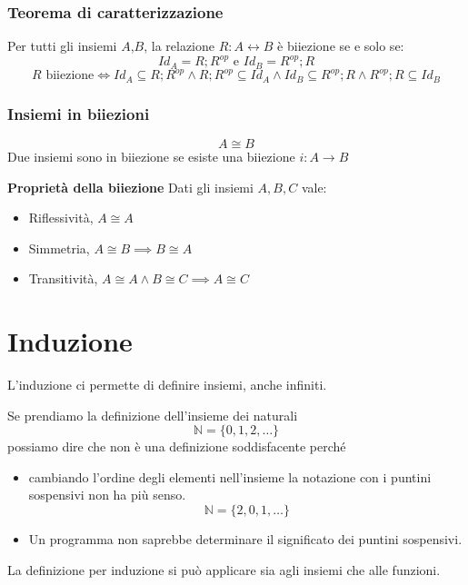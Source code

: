 \documentclass{article}
\begin{document}
\subsubsection{Teorema di caratterizzazione}
Per tutti gli insiemi \(A\),\(B\), la relazione \(R: A \leftrightarrow B\) è biiezione se e solo se:
\[Id_A = R;R^{op} \text{ e } Id_B = R^{op};R\]
\[R \text{ biiezione} \iff Id_A \subseteq R;R^{op} \land R;R^{op} \subseteq Id_A \land Id_B \subseteq R^{op};R \land R^{op};R \subseteq Id_B \]

\subsubsection{Insiemi in biiezioni}
\[A \cong B\]
Due insiemi sono in biiezione se esiste una biiezione \(i: A \rightarrow B\)

\noindent\textbf{Proprietà della biiezione}
Dati gli insiemi \(A,B,C\) vale:
\begin{itemize}
    \item Riflessività, \(A \cong A\)
    \item Simmetria, \(A \cong B \implies B \cong A\)
    \item Transitività, \(A \cong A \land B \cong C \implies A \cong C\)
\end{itemize}

\pagebreak

\section{Induzione}
L'induzione ci permette di definire insiemi, anche infiniti.

\begin{eg}
    Se prendiamo la definizione dell'insieme dei naturali
    \[\mathbb{N} = \{0,1,2,\ldots\}\]
    possiamo dire che non è una definizione soddisfacente perché
    \begin{itemize}
        \item cambiando l'ordine degli elementi nell'insieme la notazione con i puntini sospensivi non ha più senso. \[\mathbb{N} = \{2,0,1,\ldots\}\]
        \item Un programma non saprebbe determinare il significato dei puntini sospensivi.
    \end{itemize}
\end{eg}

La definizione per induzione si può applicare sia agli insiemi che alle funzioni.
\end{document}
